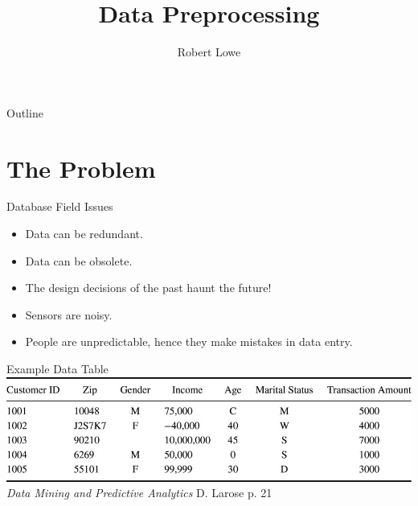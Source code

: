 \documentclass[handout]{beamer}
\title{Data Preprocessing}
\author{Robert Lowe\\}
\institute[Maryville College] %
{
  Division of Mathematics and Computer Science\\
  Maryville College
}
\date[]{}
\begin{document}
\begin{frame}
  \titlepage
\end{frame}

\begin{frame}{Outline}
  \tableofcontents
\end{frame}




\section{The Problem}
\begin{frame}{Database Field Issues}
\begin{itemize}[<+->]
   \item Data can be redundant.
   \item Data can be obsolete.
   \item The design decisions of the past haunt the future!
   \item Sensors are noisy.
   \item People are unpredictable, hence they make mistakes in data entry.
\end{itemize}
\end{frame}

\begin{frame}{Example Data Table}
\includegraphics[width=\textwidth]{images/table-2-1}
{\tiny{\em Data Mining and Predictive Analytics} D. Larose p. 21}
\end{frame}
\end{document}
